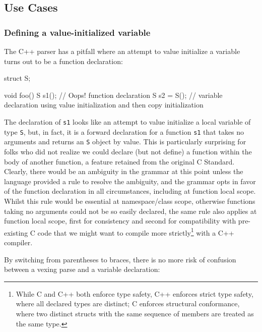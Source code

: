 \subsection[Use Cases]{Use Cases}\label{use-cases-bracedinit}

\subsubsection[Defining a value-initialized variable]{Defining a value-initialized variable}\label{defining-a-value-initialized-variable}

The C++ parser has a pitfall where an attempt to value initialize a
variable turns out to be a function declaration:

\begin{emcppslisting}
struct S{};

void foo()
{
    S s1();      // Oops! function declaration
    S s2 = S();  // variable declaration using value initialization and then copy initialization
}
\end{emcppslisting}


\noindent The declaration of \lstinline!s1! looks like an attempt to value initialize
a local variable of type \lstinline!S!, but, in fact, it is a forward
declaration for a function \lstinline!s1! that takes no arguments and
returns an \lstinline!S! object by value. This is particularly surprising
for folks who did not realize we could declare (but not define) a
function within the body of another function, a feature retained from
the original C Standard. Clearly, there would be an ambiguity in the
grammar at this point unless the language provided a rule to resolve the
ambiguity, and the grammar opts in favor of the function declaration in
all circumstances, including at function local scope. Whilst this rule
would be essential at namespace/class scope, otherwise functions taking
no arguments could not be so easily declared, the same rule also applies
at function local scope, first for consistency and second for
compatibility with pre-existing C code that we might want to compile
more strictly\footnote{While C and C++ both enforce type safety, C++
enforces strict type safety, where all declared types are distinct; C
enforces structural conformance, where two distinct structs with the
same sequence of members are treated as the same type.} with a C++ compiler.

By switching from parentheses to braces, there is no more risk of
confusion between a vexing parse and a variable declaration:

